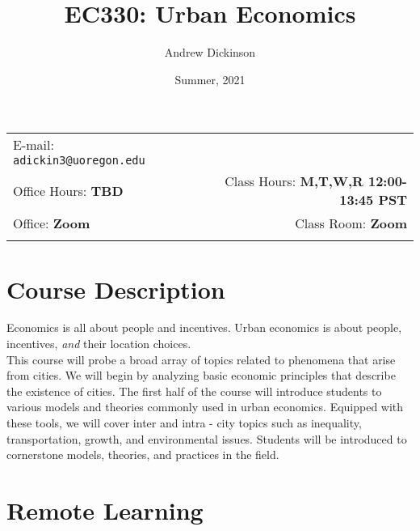 \documentclass[11pt]{article}
\title{EC330: Urban Economics}
\author{Andrew Dickinson}
\date{Summer, 2021}
\newcommand{\blankline}{\quad\pagebreak[2]}
\begin{document}
	
	\maketitle
	
	\blankline
	
	\begin{tabular*}{.93\textwidth}{@{\extracolsep{\fill}}lr}
		
		
		E-mail: \texttt{adickin3@uoregon.edu}  \\
		
		Office Hours: \textbf{TBD}  &  Class Hours:  \textbf{M,T,W,R 12:00-13:45 PST} \\
		
		Office: \textbf{Zoom} & Class Room: \textbf{Zoom}\\

		&\\
		\hline
	\end{tabular*}
	
	\vspace{5 mm}
	
	
	\section*{Course Description}
	
		
	Economics is all about people and incentives. Urban economics is about people, incentives, \textit{and} their location choices. \\
	
	\noindent This course will probe a broad array of topics related to phenomena that arise from cities. We will begin by analyzing basic economic principles that describe the existence of cities. The first half of the course will introduce students to various models and theories commonly used in urban economics. Equipped with these tools,  we will cover inter and intra - city topics such as inequality, transportation, growth, and environmental issues. Students will be introduced to cornerstone models, theories, and practices in the field.
	
	

	
	
	
	
	\section*{Remote Learning}
	
\end{document}

